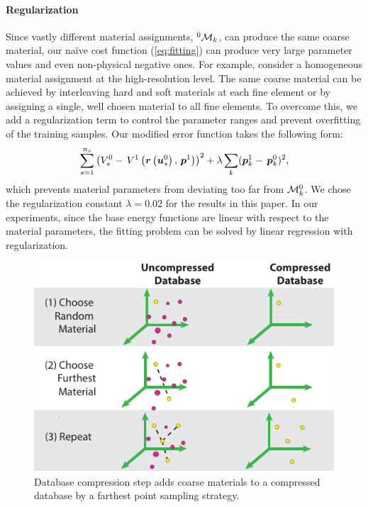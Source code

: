 \paragraph{Regularization} Since vastly different material assignments, $^0\mathcal{M}_k$, can produce the same coarse material, our na\"{i}ve cost function (\autoref{eq:fitting}) can produce very large parameter values and even non-physical negative ones.
For example, consider a homogeneous material assignment at the high-resolution level.
The same coarse material can be achieved by interleaving hard and soft materials at each fine element or by assigning a single, well chosen material to all fine elements.
To overcome this, we add a regularization term to control the parameter ranges and prevent overfitting of the training samples.
Our modified error function takes the following form:
\begin{equation}
\sum_{s=1}^{n_s}\left(V_s^0- \, V^1\left(\bm{r}\left(\bm{u}_s^0\right), \, \bm{p}^1\right)\right)^2 + 
\lambda\sum_k (\bm{p}_k^1 - \, \bm{p}_k^0)^2,
\end{equation}
which prevents material parameters from deviating too far from  $\mathcal{M}_k^0$.
We chose the regularization constant $\lambda=0.02$ for the results in this paper.
In our experiments, since the base energy functions are linear with respect to the material parameters, the fitting problem can be solved by linear regression with regularization.

\begin{figure}
	\centering
	\includegraphics[width=0.6\columnwidth]{images/compression}
	\caption{Database compression step adds coarse materials to a compressed database by a farthest point sampling strategy.}
	\label{fig:compression}
\end{figure}

